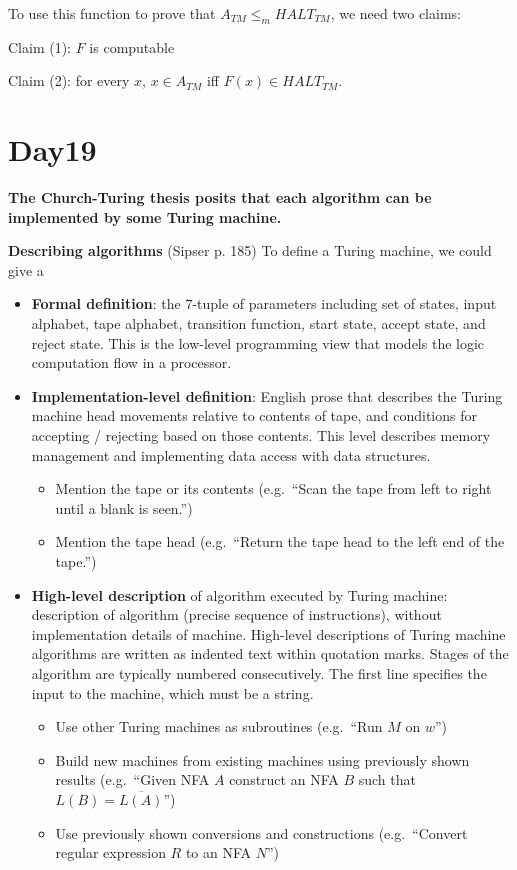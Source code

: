 \documentclass[12pt, oneside]{article}
\begin{document}
    To use this function  to prove that $A_{TM} \leq_m HALT_{TM}$, we need  two claims:

    
    Claim (1): $F$ is computable \phantom{\hspace{2in}}
    
    \vfill

    Claim (2): for every  $x$,  $x \in  A_{TM}$ iff $F(x) \in HALT_{TM}$.  
    
    \vfill
    \vfill
    \vfill \vfill
\section*{Day19}


{\bf The Church-Turing thesis posits that each algorithm can be implemented by some Turing machine.}

{\bf Describing  algorithms} (Sipser p. 185) To define a Turing machine, we could give a 
\begin{itemize}
\item {\bf Formal definition}: the $7$-tuple of parameters including set of states, 
input alphabet, tape alphabet, transition function, start state, accept state, and reject state.
This is the low-level programming view that models the logic computation flow in a processor.
\item {\bf Implementation-level definition}: English prose that describes the Turing machine head 
movements relative to contents of tape, and conditions for accepting / rejecting based on those contents.
This level describes memory management and implementing data access with data structures.
  \begin{itemize}
    \item Mention the tape or its contents (e.g.\ ``Scan the tape from left to right until a blank is seen.'')
    \item Mention the tape head (e.g.\ ``Return the tape head to the left end of the tape.'')
  \end{itemize}
\item {\bf High-level description} of algorithm executed by Turing machine: 
description of algorithm (precise sequence of instructions), 
without implementation details of machine. 
High-level descriptions of  Turing machine algorithms are written as indented text within quotation marks.   
Stages of the algorithm are typically numbered consecutively.
The first line specifies the input to the machine, which must be a string.
  \begin{itemize}
    \item Use other Turing machines as subroutines (e.g.\ ``Run $M$ on $w$'')
    \item Build new machines from existing machines using previously shown results (e.g.\ 
    ``Given NFA $A$ construct an NFA $B$ such that $L(B) = \overline{L(A)}$'')
    \item Use previously shown conversions and constructions (e.g.\ ``Convert regular expression $R$ 
    to an NFA $N$'')
  \end{itemize}
\end{itemize}
\end{document}
